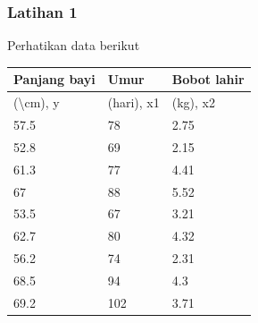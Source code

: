 \documentclass[a4paper,12pt]{article}
\begin{document}
\subsubsection{Latihan 1}
Perhatikan data berikut
\begin{table}[!ht]
	\begin{tabular}{|l|l|l|}
		\hline
		Panjang bayi            & Umur       & Bobot lahir \\ \hline
		(\textbackslash{}cm), y & (hari), x1 & (kg), x2    \\ \hline
		57.5                    & 78         & 2.75        \\ \hline
		52.8                    & 69         & 2.15        \\ \hline
		61.3                    & 77         & 4.41        \\ \hline
		67                      & 88         & 5.52        \\ \hline
		53.5                    & 67         & 3.21        \\ \hline
		62.7                    & 80         & 4.32        \\ \hline
		56.2                    & 74         & 2.31        \\ \hline
		68.5                    & 94         & 4.3         \\ \hline
		69.2                    & 102        & 3.71        \\ \hline
	\end{tabular}
\end{table}
\end{document}
